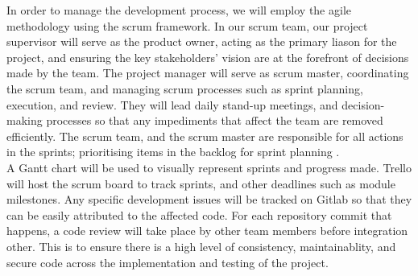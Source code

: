 
In order to manage the development process, we will employ the agile methodology using the scrum framework. In our scrum team, our project supervisor will serve as the product owner, acting as the primary liason for the project, and ensuring the key stakeholders' vision are at the forefront of decisions made by the team. The project manager will serve as scrum master, coordinating the scrum team, and managing scrum processes such as sprint planning, execution, and review. They will lead daily stand-up meetings, and decision-making processes so that any impediments that affect the team are removed efficiently. The scrum team, and the scrum master are responsible for all actions in the sprints; prioritising items in the backlog for sprint planning \cite{scrumroles}.\\

A Gantt chart will be used to visually represent sprints and progress made. Trello will host the scrum board to track sprints, and other deadlines such as module milestones. Any specific development issues will be tracked on Gitlab so that they can be easily attributed to the affected code. For each repository commit that happens, a code review will take place by other team members before integration other. This is to ensure there is a high level of consistency, maintainablity, and secure code across the implementation and testing of the project. 